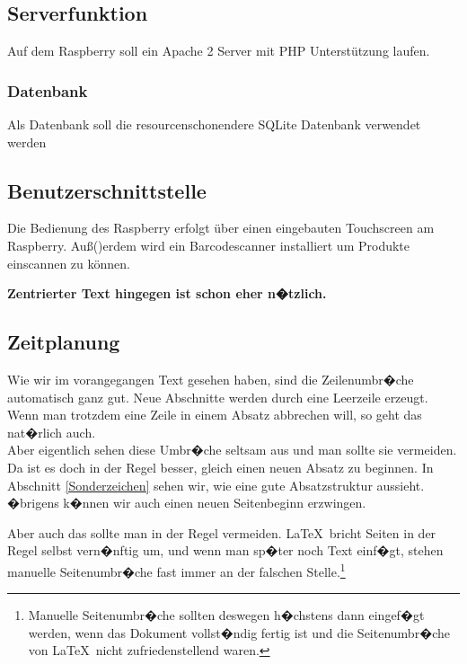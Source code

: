 \documentclass[11pt,a4paper]{article} %
\begin{document}
\subsection{Serverfunktion}
Auf dem Raspberry soll ein Apache 2 Server mit PHP Unterst\"utzung laufen.
\subsubsection{Datenbank}
Als Datenbank soll die resourcenschonendere SQLite Datenbank verwendet werden

\subsection{Benutzerschnittstelle}
Die Bedienung des Raspberry erfolgt \"uber einen eingebauten Touchscreen am Raspberry. Au\ss()erdem wird ein Barcodescanner installiert um Produkte einscannen zu k\"onnen.

\begin{center}
\begin{large}
\textbf{Zentrierter Text hingegen ist schon eher n�tzlich.}
\end{large}
\end{center}


\subsection{Zeitplanung}
\label{Umbrueche}

Wie wir im vorangegangen Text gesehen haben, sind die Zeilenumbr�che automatisch ganz gut. Neue Abschnitte werden durch eine Leerzeile erzeugt. Wenn man trotzdem eine Zeile in einem Absatz abbrechen will, so geht das nat�rlich auch. \\  Aber eigentlich sehen diese Umbr�che seltsam aus und man sollte sie vermeiden. Da ist es doch in der Regel besser, gleich einen neuen Absatz zu beginnen. In Abschnitt \ref{Sonderzeichen} sehen wir, wie eine gute Absatzstruktur aussieht. �brigens k�nnen wir auch einen neuen Seitenbeginn erzwingen.

\newpage

Aber auch das sollte man in der Regel vermeiden. \LaTeX\ bricht Seiten in der Regel selbst vern�nftig um, und wenn man sp�ter noch Text einf�gt, stehen manuelle Seitenumbr�che fast immer an der falschen Stelle.\footnote{Manuelle Seitenumbr�che sollten deswegen h�chstens dann eingef�gt werden, wenn das Dokument vollst�ndig fertig ist und die Seitenumbr�che von \LaTeX\ nicht zufriedenstellend waren.}
\end{document}
